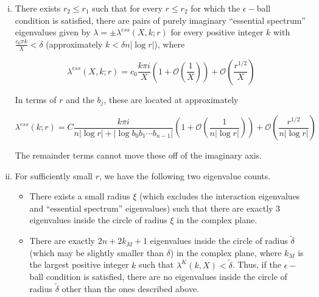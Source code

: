 \documentclass[thesis.tex]{subfiles}
\begin{document}
\begin{theorem}
\begin{enumerate}[(i)]

\item There exists $r_2 \leq r_1$ such that for every $r \leq r_2$ for which the $\epsilon-$ball condition is satisfied, there are pairs of purely imaginary ``essential spectrum'' eigenvalues given by $\lambda = \pm \lambda^{ess}(X,k; r)$ for every positive integer $k$ with $\frac{c_0 \pi k}{X} < \delta$ (approximately $k < \delta n |\log r|$), where

\begin{equation}\label{lambdaess}
\lambda^{ess}(X, k; r) = c_0 \frac{k \pi i }{X} \left( 1 + \mathcal{O}\left( \frac{1}{X} \right)\right) + \mathcal{O}\left( \frac{r^{1/2}}{X} \right)
\end{equation}

In terms of $r$ and the $b_j$, these are located at approximately

\begin{equation}\label{lambdaessr}
\lambda^{ess}(k; r) = C \frac{k \pi i }{n |\log r| + |\log b_0 b_1 \cdots b_{n-1}|}  \left( 1 + \mathcal{O}\left( \frac{1}{n |\log r|} \right)\right) + \mathcal{O}\left( \frac{r^{1/2}}{n |\log r|} \right)
\end{equation}

The remainder terms cannot move these off of the imaginary axis.

\item For sufficiently small $r$, we have the following two eigenvalue counts.

\begin{itemize}
	\item There exists a small radius $\xi$ (which excludes the interaction eigenvalues and ``essential spectrum'' eigenvalues) such that there are exactly 3 eigenvalues inside the circle of radius $\xi$ in the complex plane.

	\item There are exactly $2n + 2 k_M + 1$ eigenvalues inside the circle of radius $\tilde{\delta}$ (which may be slightly smaller than $\delta$) in the complex plane, where $k_M$ is the largest positive integer $k$ such that $\lambda^K(k,X) < \tilde{\delta}$. Thus, if the $\epsilon-$ball condition is satisfied, there are no eigenvalues inside the circle of radius $\tilde{\delta}$ other than the ones described above.
\end{itemize}
\end{enumerate}

\end{theorem}
\end{document}
